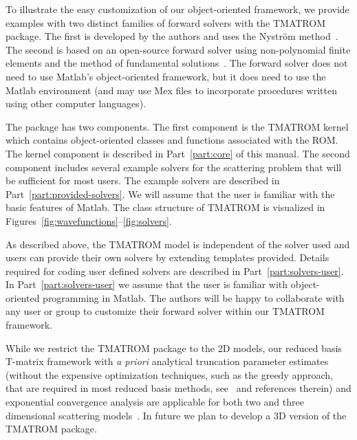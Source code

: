 \documentclass[12pt,letterpaper,final]{article}
\begin{document}
To illustrate the easy customization of  our object-oriented framework,  
we
provide examples with 
two  distinct families of forward solvers with the TMATROM package.
The first is developed by 
the authors and uses the Nystr\"om method~\cite{colton:inverse}.
The second is based on an open-source forward solver using
non-polynomial finite elements and the method of fundamental 
solutions~\cite{mpspack:manual}. 
The forward solver
does not need to use Matlab's object-oriented framework, but 
it does need to use
the Matlab environment (and may use Mex files to incorporate procedures written using other
computer languages). 


The package has two components.
The first component is the TMATROM kernel which contains object-oriented classes and functions
associated with the ROM. 
The kernel component is described in Part~\ref{part:core} of this manual.
The second component includes several example 
solvers for the scattering problem that will be
sufficient for most users. The example solvers are described in Part~\ref{part:provided-solvers}.
We will assume that the user is familiar with 
the basic features of Matlab.
The class structure of TMATROM is visualized in Figures~\ref{fig:wavefunctions}--\ref{fig:solvers}.

As described above, the TMATROM model is independent of the solver used and users
can provide their own solvers by extending templates provided.
Details required for coding user defined solvers
are described in Part~\ref{part:solvers-user}. 
In Part~\ref{part:solvers-user} we assume that the user is familiar with
object-oriented programming in Matlab.
The authors will be happy to collaborate with any user or group to customize 
their forward solver within our TMATROM framework. 

While we restrict the TMATROM package to the 2D models, our reduced basis T-matrix framework with {\em a priori} 
analytical truncation parameter estimates (without the expensive optimization techniques, such 
as the greedy approach, that are required in most reduced basis methods, see~\cite{ghs:12} and references therein) 
and exponential convergence analysis are applicable for both two and three dimensional 
scattering models~\cite{ghh:tmatrix}. In future we plan to develop a 3D version of the TMATROM package. 
\end{document}
